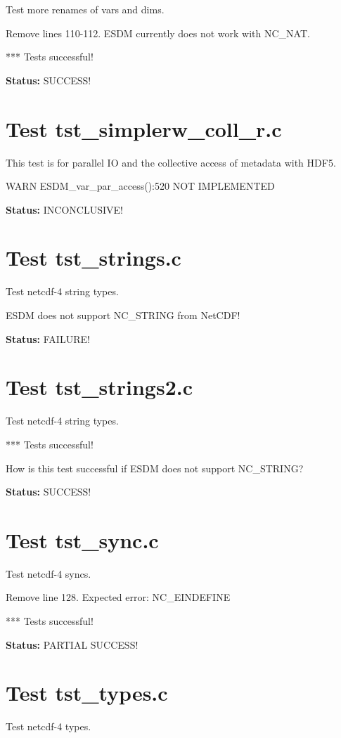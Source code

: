 Test more renames of vars and dims.

Remove lines 110-112. ESDM currently does not work with NC\_NAT.

*** Tests successful!

{\bf \large Status: } SUCCESS!

\section{Test tst\_simplerw\_coll\_r.c}

This test is for parallel IO and the collective access of metadata with HDF5.

WARN ESDM\_var\_par\_access():520 NOT IMPLEMENTED

{\bf \large Status: } INCONCLUSIVE!

\section{Test tst\_strings.c}

Test netcdf-4 string types.

ESDM does not support NC\_STRING from NetCDF!

{\bf \large Status: } FAILURE!

\section{Test tst\_strings2.c}

Test netcdf-4 string types.

*** Tests successful!

How is this test successful if ESDM does not support NC\_STRING?

{\bf \large Status: } SUCCESS!

\section{Test tst\_sync.c}

Test netcdf-4 syncs.

Remove line 128. Expected error: NC\_EINDEFINE

*** Tests successful!

{\bf \large Status: } PARTIAL SUCCESS!

\section{Test tst\_types.c}

Test netcdf-4 types.

